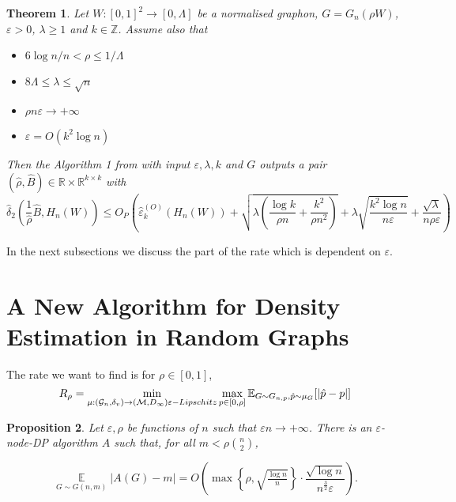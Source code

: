 \documentclass[12pt,a4paper]{article}
\newtheorem{theorem}{Theorem}[section]
\numberwithin{equation}{section}
\newtheorem{proposition}[theorem]{Proposition}
\numberwithin{equation}{section}
\def\bE{\operatorname*{\mathbb{E}}}
\renewcommand{\epsilon}{\varepsilon}
\newcommand{\1}{{\text{\Large $\mathfrak 1$}}}
\newcommand{\2}[1]{{\text{\Large $\mathfrak 1$}\!\left(#1\right)}}
\begin{document}
\begin{theorem}\label{stronger}
Let $W: [0,1]^2 \rightarrow [0,\Lambda]$ be a normalised graphon, $G=G_n(\rho W)$, $ \epsilon>0$, $\lambda \geq 1$ and $k \in \mathbb{Z}$. Assume also that
 \begin{itemize}
\item  $6 \log n/n<\rho \leq 1/\Lambda$
\item $8 \Lambda \leq \lambda  \leq \sqrt{n}$
\item $\rho n \epsilon \rightarrow +\infty$
\item $\epsilon=O(k^2 \log n)$
\end{itemize} 
Then the Algorithm 1 from \cite{Borgs2015} with input $\epsilon,\lambda,k$ and $G$ outputs a pair $(\hat{\rho},\hat{B}) \in \mathbb{R} \times \mathbb{R}^{k \times k}$ with
\begin{equation*}
\hat{\delta}_2\left(\frac{1}{\hat{\rho}}\hat{B},H_n(W)\right) \leq O_P\left(\hat{\epsilon}_k^{(O)}( H_n(W))+\sqrt{\lambda  \left(\frac{\log k}{ \rho n}+\frac{k^2}{\rho n^2}\right)} + \lambda  \sqrt{\frac{k^2\log n}{n \epsilon}}+ \frac{\sqrt{\lambda}}{n \rho \epsilon}\right)
\end{equation*}

\end{theorem}


In the next subsections we discuss the part of the rate which is dependent on $\epsilon$.
\section{A New Algorithm for Density Estimation in Random Graphs}
\label{density}


The rate we want to find is for $\rho \in [0,1]$, $$R_{\rho}=\min_{ \mu :(\mathcal{G}_n,\delta_v) \rightarrow (\mathcal{M},D_{\infty}) \\ \epsilon-Lipschitz} \max_{ p \in [0,\rho]} \mathbb{E}_{G \sim G_{n,p},\hat{p} \sim \mu_G}[|\hat{p}-p|]$$

\begin{proposition}\label{prop:32-fixed-m} Let $\epsilon, \rho$ be
  functions of $n$ such that $\epsilon n \rightarrow +\infty$. There
  is an $\epsilon$-node-DP algorithm $A$ such that, for all $m < \rho
\binom n 2$,

$$\bE_{G\sim G(n,m)} \Big| A(G) - m \Big| =  O \left(\max\left\{\rho,\sqrt{\tfrac{\log n}{n}}\right\}  \cdot\frac{\sqrt{\log n}}{n^{\frac{3}{2}} \epsilon} \right).$$
\end{proposition}
\end{document}
